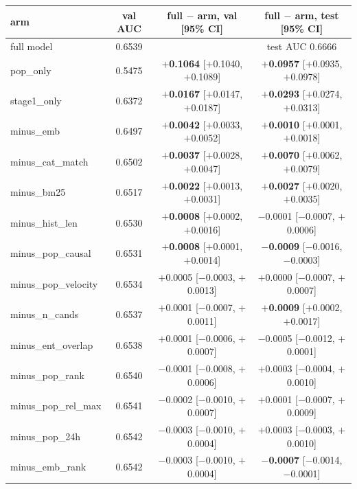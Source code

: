 \begin{tabular}{@{}lccc@{}}
\toprule
arm & val AUC & full $-$ arm, val [95\% CI] & full $-$ arm, test [95\% CI] \\
\midrule
full model & 0.6539 & & test AUC 0.6666 \\
pop\_only & 0.5475 & \textbf{$+$0.1064} [$+$0.1040, $+$0.1089] & \textbf{$+$0.0957} [$+$0.0935, $+$0.0978] \\
stage1\_only & 0.6372 & \textbf{$+$0.0167} [$+$0.0147, $+$0.0187] & \textbf{$+$0.0293} [$+$0.0274, $+$0.0313] \\
minus\_emb & 0.6497 & \textbf{$+$0.0042} [$+$0.0033, $+$0.0052] & \textbf{$+$0.0010} [$+$0.0001, $+$0.0018] \\
minus\_cat\_match & 0.6502 & \textbf{$+$0.0037} [$+$0.0028, $+$0.0047] & \textbf{$+$0.0070} [$+$0.0062, $+$0.0079] \\
minus\_bm25 & 0.6517 & \textbf{$+$0.0022} [$+$0.0013, $+$0.0031] & \textbf{$+$0.0027} [$+$0.0020, $+$0.0035] \\
minus\_hist\_len & 0.6530 & \textbf{$+$0.0008} [$+$0.0002, $+$0.0016] & $-$0.0001 [$-$0.0007, $+$0.0006] \\
minus\_pop\_causal & 0.6531 & \textbf{$+$0.0008} [$+$0.0001, $+$0.0014] & \textbf{$-$0.0009} [$-$0.0016, $-$0.0003] \\
minus\_pop\_velocity & 0.6534 & $+$0.0005 [$-$0.0003, $+$0.0013] & $+$0.0000 [$-$0.0007, $+$0.0007] \\
minus\_n\_cands & 0.6537 & $+$0.0001 [$-$0.0007, $+$0.0011] & \textbf{$+$0.0009} [$+$0.0002, $+$0.0017] \\
minus\_ent\_overlap & 0.6538 & $+$0.0001 [$-$0.0006, $+$0.0007] & $-$0.0005 [$-$0.0012, $+$0.0001] \\
minus\_pop\_rank & 0.6540 & $-$0.0001 [$-$0.0008, $+$0.0006] & $+$0.0003 [$-$0.0004, $+$0.0010] \\
minus\_pop\_rel\_max & 0.6541 & $-$0.0002 [$-$0.0010, $+$0.0007] & $+$0.0001 [$-$0.0007, $+$0.0009] \\
minus\_pop\_24h & 0.6542 & $-$0.0003 [$-$0.0010, $+$0.0004] & $+$0.0003 [$-$0.0003, $+$0.0010] \\
minus\_emb\_rank & 0.6542 & $-$0.0003 [$-$0.0010, $+$0.0004] & \textbf{$-$0.0007} [$-$0.0014, $-$0.0001] \\
\bottomrule
\end{tabular}
